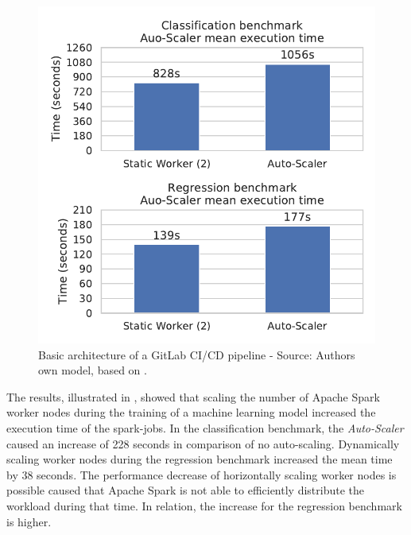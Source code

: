 \begin{figure}[h]
\centering
\includegraphics[scale=1]{images/07_evaluation/overall_auto-scaler}
\caption{Basic architecture of a GitLab CI/CD pipeline - Source: Authors own model, based on \cite{Gitlab2020Docs}.}
\label{fig:07_auto-scaler_results}
\end{figure}
The results, illustrated in , showed that scaling the number of Apache Spark worker nodes during the training of a machine learning model increased the execution time of the spark-jobs.
In the classification benchmark, the \textit{Auto-Scaler} caused an increase of 228 seconds in comparison of no auto-scaling.
Dynamically scaling worker nodes during the regression benchmark increased the mean time by 38 seconds.
The performance decrease of horizontally scaling worker nodes is possible caused that Apache Spark is not able to efficiently distribute the workload during that time. In relation, the increase for the regression benchmark is higher.
